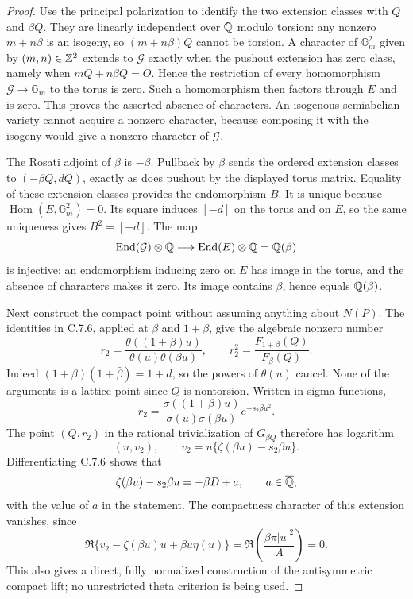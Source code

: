 \begin{proof}
Use the principal polarization to identify the two extension
classes with $Q$ and $\beta Q$. They are linearly independent
over $\mathbb Q$ modulo torsion: any nonzero $m+n\beta$ is an
isogeny, so $(m+n\beta)Q$ cannot be torsion. A character
of $\mathbb G_m^2$ given by $(m,n)\in\mathbb Z^2$ extends to
$\mathcal G$ exactly when the pushout extension has zero
class, namely when $mQ+n\beta Q=O$. Hence the restriction
of every homomorphism $\mathcal G\to\mathbb G_m$ to
the torus is zero. Such a homomorphism then factors through
$E$ and is zero. This proves the asserted absence of
characters. An isogenous semiabelian variety cannot acquire
a nonzero character, because composing it with the isogeny
would give a nonzero character of $\mathcal G$.

The Rosati adjoint of $\beta$ is $-\beta$. Pullback by
$\beta$ sends the ordered extension classes to
$(-\beta Q,dQ)$, exactly as does pushout by the displayed
torus matrix. Equality of these extension classes provides
the endomorphism $B$. It is unique because
$\operatorname{Hom}(E,\mathbb G_m^2)=0$. Its square
induces $[-d]$ on the torus and on $E$, so the same
uniqueness gives $B^2=[-d]$. The map
\[
 \operatorname{End}(\mathcal G)\otimes\mathbb Q
     \longrightarrow\operatorname{End}(E)\otimes\mathbb Q
          =\mathbb Q(\beta)
\]
is injective: an endomorphism inducing zero on $E$ has image
in the torus, and the absence of characters makes it zero.
Its image contains $\beta$, hence equals $\mathbb Q(\beta)$.

Next construct the compact point without assuming anything
about $N(P)$. The identities in C.7.6, applied at $\beta$
and $1+\beta$, give the algebraic nonzero number
\begin{equation}\label{eq:ce-ribet-r}
 r_2=\frac{\theta((1+\beta)u)}{\theta(u)\theta(\beta u)},
 \qquad r_2^2=\frac{F_{1+\beta}(Q)}{F_\beta(Q)}.
\end{equation}
Indeed $(1+\beta)(1+\bar\beta)=1+d$, so the powers
of $\theta(u)$ cancel. None of the arguments is a lattice
point since $Q$ is nontorsion. Written in sigma functions,
\[
 r_2=\frac{\sigma((1+\beta)u)}{\sigma(u)\sigma(\beta u)}
                         e^{-s_2\beta u^2}.
\]
The point $(Q,r_2)$ in the rational trivialization of
$G_{\beta Q}$ therefore has logarithm
\[
 (u,v_2),\qquad
 v_2=u\{\zeta(\beta u)-s_2\beta u\}.
\]
Differentiating C.7.6 shows that
\begin{equation}\label{eq:ce-zeta}
 \zeta(\beta u)-s_2\beta u=-\beta D+a,
 \qquad a\in\overline{\mathbb Q},
\end{equation}
with the value of $a$ in the statement. The compactness
character of this extension vanishes, since
\[
 \Re\{v_2-\zeta(\beta u)u+\beta u\eta(u)\}
    =\Re\left(\frac{\beta\pi|u|^2}{A}\right)=0.
\]
This also gives a direct, fully normalized construction of
the antisymmetric compact lift; no unrestricted theta
criterion is being used.


\end{proof}
